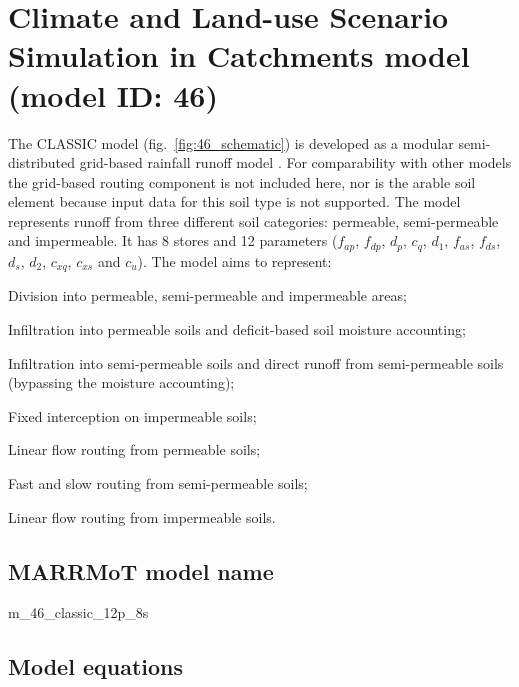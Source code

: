 \section{Climate and Land-use Scenario Simulation in Catchments model (model ID: 46)}
The CLASSIC model (fig.~\ref{fig:46_schematic}) is developed as a modular semi-distributed grid-based rainfall runoff model \citep{Crooks2007}. For comparability with other models the grid-based routing component is not included here, nor is the arable soil element because input data for this soil type is not supported. The model represents runoff from three different soil categories: permeable, semi-permeable and impermeable. It has 8 stores and 12 parameters ($f_{ap}$, $f_{dp}$, $d_p$, $c_q$, $d_1$, $f_{as}$, $f_{ds}$, $d_s$, $d_2$, $c_{xq}$, $c_{xs}$ and $c_{u}$). The model aims to represent:

\begin{itemizecompact}
\item Division into permeable, semi-permeable and impermeable areas;
\item Infiltration into permeable soils and deficit-based soil moisture accounting;
\item Infiltration into semi-permeable soils and direct runoff from semi-permeable soils (bypassing the moisture accounting);
\item Fixed interception on impermeable soils;
\item Linear flow routing from permeable soils;
\item Fast and slow routing from semi-permeable soils;
\item Linear flow routing from impermeable soils.
\end{itemizecompact}

\subsection{MARRMoT model name}
m\_46\_classic\_12p\_8s \\

\subsection{Model equations}

